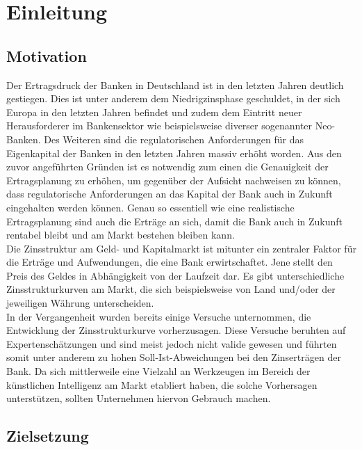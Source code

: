 \section{Einleitung} \label{sec: Einleitung}

\subsection{Motivation} \label{sec: Motivation}


Der Ertragsdruck der Banken in Deutschland ist in den letzten Jahren deutlich gestiegen.
Dies ist unter anderem dem Niedrigzinsphase geschuldet, in der sich Europa in den letzten Jahren befindet und zudem
dem Eintritt neuer Herausforderer im Bankensektor wie beispielsweise diverser sogenannter Neo-Banken.
Des Weiteren sind die regulatorischen Anforderungen für das Eigenkapital der Banken in den letzten Jahren massiv erhöht worden.
Aus den zuvor angeführten Gründen ist es notwendig zum einen die Genauigkeit der Ertragsplanung zu erhöhen, um
gegenüber der Aufsicht nachweisen zu können, dass regulatorische Anforderungen an das Kapital der Bank auch in Zukunft
eingehalten werden können.
Genau so essentiell wie eine realistische Ertragsplanung sind auch die Erträge an sich, damit die Bank auch in Zukunft
rentabel bleibt und am Markt bestehen bleiben kann.\\

Die Zinsstruktur am Geld- und Kapitalmarkt ist mitunter ein zentraler Faktor für die Erträge und Aufwendungen, die eine
Bank erwirtschaftet.
Jene stellt den Preis des Geldes in Abhängigkeit von der Laufzeit dar.
Es gibt unterschiedliche Zinsstrukturkurven am Markt, die sich beispielsweise von Land und/oder der jeweiligen Währung
unterscheiden.\\

In der Vergangenheit wurden bereits einige Versuche unternommen, die Entwicklung der Zinsstrukturkurve vorherzusagen.
Diese Versuche beruhten auf Expertenschätzungen und sind meist jedoch nicht valide gewesen und führten somit unter anderem zu
hohen Soll-Ist-Abweichungen bei den Zinserträgen der Bank.
Da sich mittlerweile eine Vielzahl an Werkzeugen im Bereich der künstlichen Intelligenz am Markt etabliert haben, die
solche Vorhersagen unterstützen, sollten Unternehmen hiervon Gebrauch machen.

\subsection{Zielsetzung} \label{sec: Zielsetzung}

